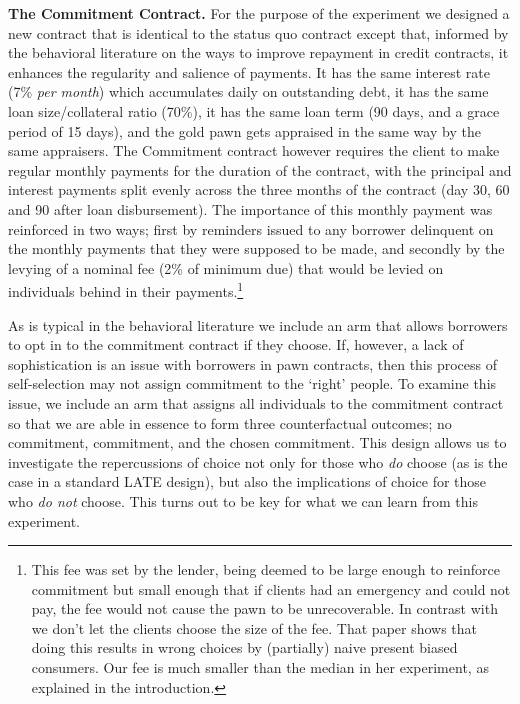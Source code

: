 \documentclass[oneside,11pt]{article}
\begin{document}
\noindent \textbf{The Commitment Contract.} For the purpose of the experiment we designed a new contract that is identical to the status quo contract except that, informed by the behavioral literature on the ways to improve repayment in credit contracts, it enhances the regularity and salience of payments. It has the same interest rate (7\% \textit{per month}) which accumulates daily on outstanding debt, it has the same loan size/collateral ratio (70\%), it has the same loan term (90 days, and a grace period of 15 days), and the gold pawn gets appraised in the same way by the same appraisers. The Commitment contract however requires the client to make regular monthly payments for the duration of the contract, with the principal and interest payments split evenly across the three months of the contract (day 30, 60 and 90 after loan disbursement). The importance of this monthly payment was reinforced in two ways; first by reminders issued to any borrower delinquent on the monthly payments that they were supposed to be made, and secondly by the levying of a nominal fee (2\% of minimum due) that would be levied on individuals behind in their payments.\footnote{This fee was set by the lender, being deemed to be large enough to reinforce commitment but small enough that if clients had an emergency and could not pay, the fee would not cause the pawn to be unrecoverable.  In contrast with \cite{John} we don't let the clients choose the size of the fee. That paper shows that doing this results in wrong choices by (partially) naive present biased consumers. Our fee is much smaller than the median in her experiment, as explained in the introduction. %
}


As is typical in the behavioral literature we include an arm that allows borrowers to opt in to the commitment contract if they choose.  If, however, a lack of sophistication is an issue with borrowers in pawn contracts, then this process of self-selection may not assign commitment to the `right' people.  To examine this issue, we include an arm  that assigns all individuals to the commitment contract so that we are able in essence to form three counterfactual outcomes; no commitment, commitment, and the chosen commitment.  This design allows us to investigate the repercussions of choice not only for those who \textit{do} choose (as is the case in a standard LATE design), but also the implications of choice for those who \textit{do not} choose.  This turns out to be key for what we can learn from this experiment.  
\end{document}
